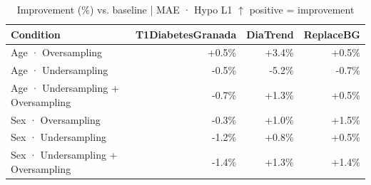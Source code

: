 \begin{table}[htbp]
\centering
\small
\caption{Improvement (\%) vs. baseline  |  MAE · Hypo L1  $\uparrow$ positive = improvement}
\label{tab:delta_mae_tbr_1_family_mechanism_random}
\begin{tabular}{lrrr}
\toprule
\textbf{Condition} & \textbf{T1DiabetesGranada} & \textbf{DiaTrend} & \textbf{ReplaceBG} \\
\midrule
Age · Oversampling & \textcolor{OliveGreen}{+0.5\%} & \textcolor{OliveGreen}{+3.4\%} & \textcolor{OliveGreen}{+0.5\%} \\
Age · Undersampling & \textcolor{BrickRed}{-0.5\%} & \textcolor{BrickRed}{-5.2\%} & \textcolor{BrickRed}{-0.7\%} \\
Age · Undersampling + Oversampling & \textcolor{BrickRed}{-0.7\%} & \textcolor{OliveGreen}{+1.3\%} & \textcolor{OliveGreen}{+0.5\%} \\
\midrule
Sex · Oversampling & \textcolor{BrickRed}{-0.3\%} & \textcolor{OliveGreen}{+1.0\%} & \textcolor{OliveGreen}{+1.5\%} \\
Sex · Undersampling & \textcolor{BrickRed}{-1.2\%} & \textcolor{OliveGreen}{+0.8\%} & \textcolor{OliveGreen}{+0.5\%} \\
Sex · Undersampling + Oversampling & \textcolor{BrickRed}{-1.4\%} & \textcolor{OliveGreen}{+1.3\%} & \textcolor{OliveGreen}{+1.4\%} \\
\bottomrule
\end{tabular}
\end{table}